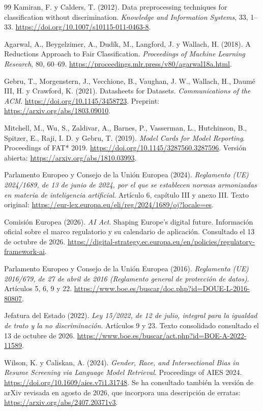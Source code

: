 \documentclass[11pt,a4paper,oneside]{report}
\begin{document}
\begin{thebibliography}{99}
 Kamiran, F. y Calders, T. (2012). Data preprocessing techniques for classification without discrimination. \textit{Knowledge and Information Systems}, 33, 1--33. \url{https://doi.org/10.1007/s10115-011-0463-8}.

 Agarwal, A., Beygelzimer, A., Dudík, M., Langford, J. y Wallach, H. (2018). A Reductions Approach to Fair Classification. \textit{Proceedings of Machine Learning Research}, 80, 60--69. \url{https://proceedings.mlr.press/v80/agarwal18a.html}.

 Gebru, T., Morgenstern, J., Vecchione, B., Vaughan, J. W., Wallach, H., Daumé III, H. y Crawford, K. (2021). Datasheets for Datasets. \textit{Communications of the ACM}. \url{https://doi.org/10.1145/3458723}. Preprint: \url{https://arxiv.org/abs/1803.09010}.

 Mitchell, M., Wu, S., Zaldivar, A., Barnes, P., Vasserman, L., Hutchinson, B., Spitzer, E., Raji, I. D. y Gebru, T. (2019). \textit{Model Cards for Model Reporting}. Proceedings of FAT* 2019. \url{https://doi.org/10.1145/3287560.3287596}. Versión abierta: \url{https://arxiv.org/abs/1810.03993}.

 Parlamento Europeo y Consejo de la Unión Europea (2024). \textit{Reglamento (UE) 2024/1689, de 13 de junio de 2024, por el que se establecen normas armonizadas en materia de inteligencia artificial}. Artículo 6, capítulo III y anexo III. Texto original: \url{https://eur-lex.europa.eu/eli/reg/2024/1689/oj?locale=es}.

 Comisión Europea (2026). \textit{AI Act}. Shaping Europe's digital future. Información oficial sobre el marco regulatorio y su calendario de aplicación. Consultado el 13 de octubre de 2026. \url{https://digital-strategy.ec.europa.eu/en/policies/regulatory-framework-ai}.

 Parlamento Europeo y Consejo de la Unión Europea (2016). \textit{Reglamento (UE) 2016/679, de 27 de abril de 2016 (Reglamento general de protección de datos)}. Artículos 5, 6, 9 y 22. \url{https://www.boe.es/buscar/doc.php?id=DOUE-L-2016-80807}.

 Jefatura del Estado (2022). \textit{Ley 15/2022, de 12 de julio, integral para la igualdad de trato y la no discriminación}. Artículos 9 y 23. Texto consolidado consultado el 13 de octubre de 2026. \url{https://www.boe.es/buscar/act.php?id=BOE-A-2022-11589}.

 Wilson, K. y Caliskan, A. (2024). \textit{Gender, Race, and Intersectional Bias in Resume Screening via Language Model Retrieval}. Proceedings of AIES 2024. \url{https://doi.org/10.1609/aies.v7i1.31748}. Se ha consultado también la versión de arXiv revisada en agosto de 2026, que incorpora una descripción de erratas: \url{https://arxiv.org/abs/2407.20371v3}.


\end{thebibliography}
\end{document}

